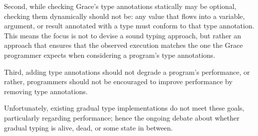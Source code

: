 Second, while checking Grace's type annotations
statically may be optional, checking them dynamically should
not be: any value that flows into a variable, argument, or result
annotated with a type must conform to that type annotation.
This means the focus is not to devise a sound typing approach,
but rather an approach that ensures that the observed execution matches
the one the Grace programmer expects when considering a program's type annotations.

Third, adding type
annotations should not degrade a program's performance, or rather,
programmers should not be encouraged to improve performance by removing
type annotations.

Unfortunately, existing gradual type
implementations do not meet these goals, particularly regarding
performance; hence the ongoing debate about whether gradual typing is
alive, dead, or some state
in between\citep{Takikawa2016,Vitousek2017,Muehlboeck2017,Bauman2017,Richards2017,Greenman2018}.






